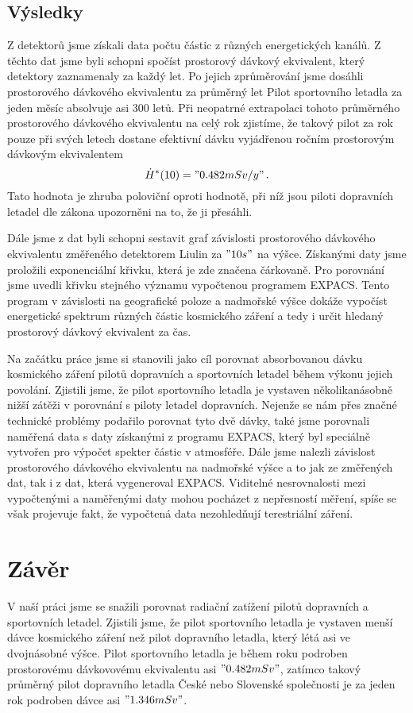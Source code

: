 \documentclass[12pt,a4paper]{article}
\begin{document}
\subsection*{Výsledky}
Z detektorů jsme získali data počtu částic z různých energetických kanálů. Z těchto dat
jsme byli schopni spočíst prostorový dávkový ekvivalent, který detektory zaznamenaly za každý let.
Po jejich zprůměrování jsme dosáhli prostorového dávkového ekvivalentu za
průměrný let
Pilot sportovního letadla za jeden měsíc absolvuje asi 300 letů. Při neopatrné
extrapolaci tohoto průměrného prostorového dávkového ekvivalentu na celý rok zjistíme, že takový pilot za rok
pouze při svých letech dostane efektivní dávku vyjádřenou ročním prostorovým dávkovým ekvivalentem
$$ \dot{H}^\ast(10)="0.482 mSv/y"\,. $$
Tato hodnota je zhruba poloviční oproti hodnotě, při níž jsou piloti dopravních letadel dle zákona upozorněni na to, že
ji přesáhli.\par
Dále jsme z dat byli schopni sestavit graf závislosti prostorového dávkového ekvivalentu změřeného detektorem
Liulin za $"10 s"$ na výšce. Získanými daty jsme proložili exponenciální křivku, která
je zde značena čárkovaně. Pro porovnání jsme uvedli křivku
stejného významu vypočtenou programem EXPACS. Tento program v závislosti na geografické poloze a nadmořské výšce dokáže
vypočíst energetické spektrum různých částic kosmického záření a tedy i určit hledaný prostorový
dávkový ekvivalent za čas.
\begin{center}
\end{center}
Na začátku práce jsme si stanovili jako cíl porovnat absorbovanou dávku kosmického záření pilotů
dopravních a sportovních letadel během výkonu jejich povolání. Zjistili jsme, že pilot sportovního
letadla je vystaven několikanásobně nižší zátěži v porovnání s piloty letadel dopravních. Nejenže
se nám přes značné technické problémy podařilo porovnat tyto dvě dávky, také jsme porovnali naměřená
data s daty získanými z programu EXPACS, který byl speciálně vytvořen pro výpočet spekter částic v atmosféře.
Dále jsme nalezli závislost prostorového dávkového ekvivalentu na nadmořské výšce a to jak ze změřených
dat, tak i z dat, která vygeneroval EXPACS. Viditelné nesrovnalosti mezi vypočtenými a naměřenými daty
mohou pocházet z nepřesností měření, spíše se však projevuje fakt, že vypočtená data nezohledňují
terestriální záření.\newpage

\section*{Závěr}
V naší práci jsme se snažili porovnat radiační zatížení pilotů dopravních a sportovních letadel. Zjistili
jsme, že pilot sportovního letadla je vystaven menší dávce kosmického záření než pilot dopravního letadla,
který létá asi ve dvojnásobné výšce. Pilot sportovního letadla je během roku podroben
prostorovému dávkovovému ekvivalentu asi $"0.482 mSv" $, zatímco takový průměrný pilot dopravního
letadla České nebo Slovenské společnosti je za jeden rok podroben dávce asi $"1.346 mSv"$.
\end{document}
